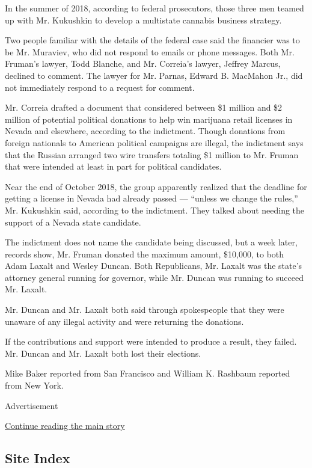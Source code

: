 In the summer of 2018, according to federal prosecutors, those three men
teamed up with Mr. Kukushkin to develop a multistate cannabis business
strategy.

Two people familiar with the details of the federal case said the
financier was to be Mr. Muraviev, who did not respond to emails or phone
messages. Both Mr. Fruman's lawyer, Todd Blanche, and Mr. Correia's
lawyer, Jeffrey Marcus, declined to comment. The lawyer for Mr. Parnas,
Edward B. MacMahon Jr., did not immediately respond to a request for
comment.

Mr. Correia drafted a document that considered between \$1 million and
\$2 million of potential political donations to help win marijuana
retail licenses in Nevada and elsewhere, according to the indictment.
Though donations from foreign nationals to American political campaigns
are illegal, the indictment says that the Russian arranged two wire
transfers totaling \$1 million to Mr. Fruman that were intended at least
in part for political candidates.

Near the end of October 2018, the group apparently realized that the
deadline for getting a license in Nevada had already passed --- ``unless
we change the rules,'' Mr. Kukushkin said, according to the indictment.
They talked about needing the support of a Nevada state candidate.

The indictment does not name the candidate being discussed, but a week
later, records show, Mr. Fruman donated the maximum amount, \$10,000, to
both Adam Laxalt and Wesley Duncan. Both Republicans, Mr. Laxalt was the
state's attorney general running for governor, while Mr. Duncan was
running to succeed Mr. Laxalt.

Mr. Duncan and Mr. Laxalt both said through spokespeople that they were
unaware of any illegal activity and were returning the donations.

If the contributions and support were intended to produce a result, they
failed. Mr. Duncan and Mr. Laxalt both lost their elections.

Mike Baker reported from San Francisco and William K. Rashbaum reported
from New York.

Advertisement

\protect\hyperlink{after-bottom}{Continue reading the main story}

\hypertarget{site-index}{%
\subsection{Site Index}\label{site-index}}

